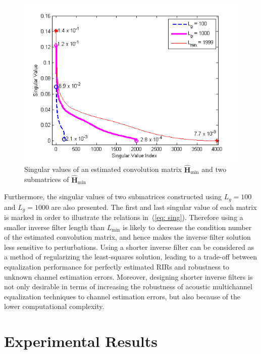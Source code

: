 \documentclass{article}
\begin{document}
\begin{figure}[t!]
\includegraphics[scale=0.6]{EUSIPCOplots/typicalsing_val}
  \vspace{-0.6cm}
\caption{Singular values of an estimated convolution matrix $\hat{\mathbf{H}}_{\min}$ and two submatrices of $\hat{\mathbf{H}}_{\min}$}
\label{fig: singval} 
\vspace{-0.4cm}
\end{figure}
Furthermore, the singular values of two submatrices constructed using $L_g = 100$ and $L_g = 1000$ are also presented.
The first and last singular value of each matrix is marked in order to illustrate the relations in~(\ref{eq: sing}).
Therefore using a smaller inverse filter length than $L_{\min}$ is likely to decrease the condition number of the estimated convolution matrix, and hence makes the inverse filter solution less sensitive to perturbations. 
Using a shorter inverse filter can be considered as a method of regularizing the least-squares solution, leading to a trade-off between equalization performance for perfectly estimated RIRs and robustness to unknown channel estimation errors. 
Moreover, designing shorter inverse filters is not only desirable in terms of increasing the robustness of acoustic multichannel equalization techniques to channel estimation errors, but also because of the lower computational complexity. 

\vspace{-0.2cm}
\section{Experimental Results}
\vspace{-0.2cm}
\end{document}
